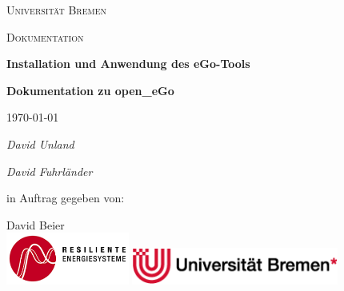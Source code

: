 \documentclass[
a4paper,     %
12pt         %
]{scrartcl}  %
\begin{document}
\begin{titlepage}
	\centering
	{\scshape\Large Universität Bremen \par}
	\vspace{0.8cm}
	{\scshape\LARGE Dokumentation \par}
	\vspace{1.7cm}
	{\huge\bfseries {Installation und Anwendung des eGo-Tools}\par}
	\vspace{1cm}
	{ \bfseries{Dokumentation zu open\_eGo}\par}
	\vspace{2cm}
	{\large \today\par}
	\vspace{2cm}

	{\Large\itshape David Unland \par}
	{\Large\itshape David Fuhrländer \par}

	\vfill
	in Auftrag gegeben von:\par

	David Beier\\
	\vfill
	\includegraphics[height = 17mm]{Abb/RES_EN_logo_de_rot_mittel.png}%
	\hfill
	\includegraphics[height = 12mm]{Abb/Logo_uni_Bild1.png}



\end{titlepage}



\newpage
\end{document}
